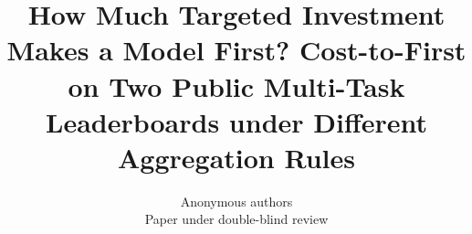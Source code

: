 \documentclass{article}
\title{How Much Targeted Investment Makes a Model First? Cost-to-First on Two Public Multi-Task Leaderboards under Different Aggregation Rules}
\author{Anonymous authors\\Paper under double-blind review}
\begin{document}
\maketitle
\begin{abstract}\end{abstract}









\appendix




\end{document}
